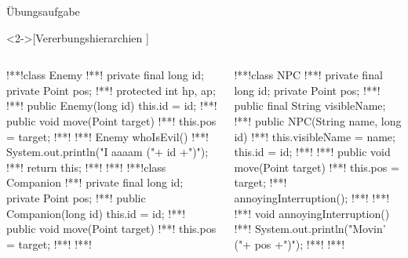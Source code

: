 \begin{frame}[c, fragile]{Übungsaufgabe}
\begin{exercise}<2->[Vererbungshierarchien ]
\begin{columns}[c]
%
\begin{column}{.4\linewidth}
\begin{plainjava}[morekeywords={[3]{Enemy,Companion}},belowskip=0pt,aboveskip=3pt]
!**!class Enemy {
!**!  private final long id; private Point pos;
!**!  protected int hp, ap;
!**!  public Enemy(long id) { this.id = id; }
!**!  public void move(Point target) {
!**!    this.pos = target;
!**!  }
!**!  Enemy whoIsEvil() {
!**!    System.out.println("I aaaam ("+ id +")");
!**!    return this;
!**!  }
!**!}
!**!class Companion {
!**!  private final long id; private Point pos;
!**!  public Companion(long id) { this.id = id; }
!**!  public void move(Point target) {
!**!    this.pos = target;
!**!  }
!**!}
\end{plainjava}
\end{column}
\begin{column}{.4\linewidth}
\begin{plainjava}[morekeywords={[3]{NPC}},belowskip=0pt,aboveskip=3pt]
!**!class NPC {
!**!  private final long id; private Point pos;
!**!  public final String visibleName;
!**!  public NPC(String name, long id) {
!**!    this.visibleName = name; this.id = id;
!**!  }
!**!  public void move(Point target) {
!**!    this.pos = target;
!**!    annoyingInterruption();
!**!  }
!**!
!**!  void annoyingInterruption() {
!**!    System.out.println("Movin' ("+ pos +")");
!**!  }
!**!}
\end{plainjava}
\end{column}
\end{columns}
    \end{exercise}
\end{frame}

